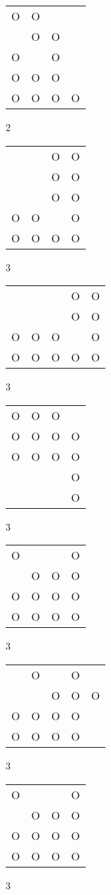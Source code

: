 \begin{tabular}{|m{0.2cm}m{0.2cm}m{0.2cm}m{0.2cm}|}\hline
O&O& & \\
 &O&O& \\
O& &O& \\
O&O&O& \\
O&O&O&O\\
\hline\end{tabular}2
\begin{tabular}{|m{0.2cm}m{0.2cm}m{0.2cm}m{0.2cm}|}\hline
 & &O&O\\
 & &O&O\\
 & &O&O\\
O&O& &O\\
O&O&O&O\\
\hline\end{tabular}3
\begin{tabular}{|m{0.2cm}m{0.2cm}m{0.2cm}m{0.2cm}m{0.2cm}|}\hline
 & & &O&O\\
 & & &O&O\\
O&O&O& &O\\
O&O&O&O&O\\
\hline\end{tabular}3
\begin{tabular}{|m{0.2cm}m{0.2cm}m{0.2cm}m{0.2cm}|}\hline
O&O&O& \\
O&O&O&O\\
O&O&O&O\\
 & & &O\\
 & & &O\\
\hline\end{tabular}3
\begin{tabular}{|m{0.2cm}m{0.2cm}m{0.2cm}m{0.2cm}|}\hline
O& & &O\\
 &O&O&O\\
O&O&O&O\\
O&O&O&O\\
\hline\end{tabular}3
\begin{tabular}{|m{0.2cm}m{0.2cm}m{0.2cm}m{0.2cm}m{0.2cm}|}\hline
 &O& &O& \\
 & &O&O&O\\
O&O&O&O& \\
O&O&O&O& \\
\hline\end{tabular}3
\begin{tabular}{|m{0.2cm}m{0.2cm}m{0.2cm}m{0.2cm}|}\hline
O& & &O\\
 &O&O&O\\
O&O&O&O\\
O&O&O&O\\
\hline\end{tabular}3
